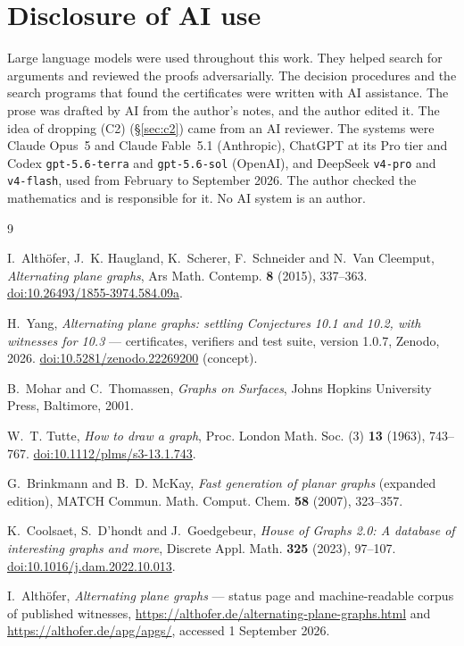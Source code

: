 \documentclass[11pt,a4paper]{amsart}
\theoremstyle{plain}
\theoremstyle{definition}
\newcommand{\artifactversion}{1.0.7}
\begin{document}
\section*{Disclosure of AI use}

Large language models were used throughout this work. They helped search for
arguments and reviewed the proofs adversarially. The decision procedures and
the search programs that found the certificates were written with AI
assistance. The prose was drafted by AI from the author's notes, and the author
edited it. The idea of dropping (C2) (\S\ref{sec:c2}) came from an AI
reviewer. The systems were Claude Opus~5 and Claude Fable~5.1 (Anthropic),
ChatGPT at its Pro tier and Codex \texttt{gpt-5.6-terra} and
\texttt{gpt-5.6-sol} (OpenAI), and DeepSeek \texttt{v4-pro} and
\texttt{v4-flash}, used from February to September 2026. The author checked the
mathematics and is responsible for it. No AI system is an author.

\begin{thebibliography}{9}

I.~Alth\"ofer, J.~K. Haugland, K.~Scherer, F.~Schneider and N.~Van Cleemput,
\emph{Alternating plane graphs},
Ars Math. Contemp. \textbf{8} (2015), 337--363.
\href{https://doi.org/10.26493/1855-3974.584.09a}{doi:10.26493/1855-3974.584.09a}.

H.~Yang, \emph{Alternating plane graphs: settling Conjectures 10.1 and 10.2,
with witnesses for 10.3} --- certificates, verifiers and test suite, version
\artifactversion, Zenodo, 2026.
\href{https://doi.org/10.5281/zenodo.22269200}{doi:10.5281/zenodo.22269200}
(concept).

B.~Mohar and C.~Thomassen, \emph{Graphs on Surfaces},
Johns Hopkins University Press, Baltimore, 2001.

W.~T. Tutte, \emph{How to draw a graph},
Proc. London Math. Soc. (3) \textbf{13} (1963), 743--767.
\href{https://doi.org/10.1112/plms/s3-13.1.743}{doi:10.1112/plms/s3-13.1.743}.

G.~Brinkmann and B.~D. McKay,
\emph{Fast generation of planar graphs} (expanded edition),
MATCH Commun. Math. Comput. Chem. \textbf{58} (2007), 323--357.

K.~Coolsaet, S.~D'hondt and J.~Goedgebeur,
\emph{House of Graphs 2.0: A database of interesting graphs and more},
Discrete Appl. Math. \textbf{325} (2023), 97--107.
\href{https://doi.org/10.1016/j.dam.2022.10.013}{doi:10.1016/j.dam.2022.10.013}.

I.~Alth\"ofer, \emph{Alternating plane graphs} --- status page and
machine-readable corpus of published witnesses,
\url{https://althofer.de/alternating-plane-graphs.html} and
\url{https://althofer.de/apg/apgs/}, accessed 1 September 2026.

\end{thebibliography}
\end{document}
